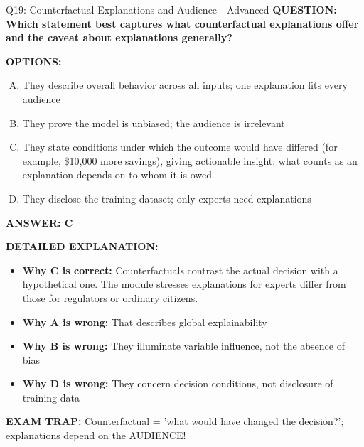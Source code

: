 \documentclass[8pt]{beamer}
\begin{document}
\begin{frame}[shrink=6]{Q19: Counterfactual Explanations and Audience - Advanced}
\fontsize{6.5}{7.5}\selectfont
\textbf{QUESTION: Which statement best captures what counterfactual explanations offer and the caveat about explanations generally?}

\vspace{0.1cm}
\textbf{OPTIONS:}
\begin{enumerate}[A.]
\item They describe overall behavior across all inputs; one explanation fits every audience
\item They prove the model is unbiased; the audience is irrelevant
\item They state conditions under which the outcome would have differed (for example, \$10,000 more savings), giving actionable insight; what counts as an explanation depends on to whom it is owed
\item They disclose the training dataset; only experts need explanations
\end{enumerate}

\vspace{0.1cm}
\textcolor{myblue}{\textbf{ANSWER: C}}

\vspace{0.1cm}
\textbf{DETAILED EXPLANATION:}
\begin{itemize}
\item \textbf{Why C is correct:} Counterfactuals contrast the actual decision with a hypothetical one. The module stresses explanations for experts differ from those for regulators or ordinary citizens.
\item \textbf{Why A is wrong:} That describes global explainability
\item \textbf{Why B is wrong:} They illuminate variable influence, not the absence of bias
\item \textbf{Why D is wrong:} They concern decision conditions, not disclosure of training data
\end{itemize}

\textcolor{myred}{\textbf{EXAM TRAP:}} Counterfactual = 'what would have changed the decision?'; explanations depend on the AUDIENCE!
\end{frame}

\end{document}
